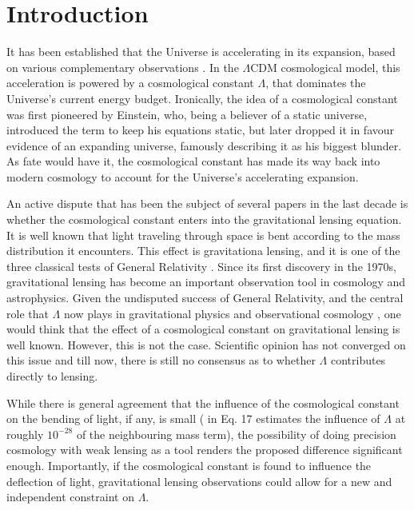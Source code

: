 \chapter{Introduction}


It has been established that the Universe is accelerating in its expansion, based on various complementary observations \citep{riess2004type,spergel2003first}. In the $\Lambda \text{CDM}$ cosmological model, this acceleration is powered by a cosmological constant $\Lambda$, that dominates the Universe's current energy budget. Ironically, the idea of a cosmological constant was first pioneered by Einstein, who, being a believer of a static universe, introduced the term to keep his equations static, but later dropped it in favour evidence of an expanding universe, famously describing it as his biggest blunder. As fate would have it, the cosmological constant has made its way back into modern cosmology to account for the Universe's accelerating expansion. 

An active dispute that has been the subject of several papers in the last decade is whether the cosmological constant enters into the gravitational lensing equation. It is well known that light traveling through space is bent according to the mass distribution it encounters. This effect is gravitationa lensing, and it is one of the three classical tests of General Relativity \cite{will1993theory}. Since its first discovery in the 1970s, gravitational lensing has become an important observation tool in cosmology and astrophysics. Given the undisputed success of General Relativity, and the central role that $\Lambda$ now plays in gravitational physics and observational cosmology \citep{peebles2003cosmological}, one would think that the effect of a cosmological constant on gravitational lensing is well known. However, this is not the case. Scientific opinion has not converged on this issue and till now, there is still no consensus as to whether $\Lambda$ contributes directly to lensing. 

While there is general agreement that the influence of the cosmological constant on the bending of light, if any, is small (\citet{rindler2007contribution} in Eq. 17 estimates the influence of $\Lambda$ at roughly $10^{-28}$ of the neighbouring mass term), the possibility of doing precision cosmology with weak lensing as a tool renders the proposed difference significant enough. Importantly, if the cosmological constant is found to influence the deflection of light, gravitational lensing observations could allow for a new and independent constraint on $\Lambda$.

